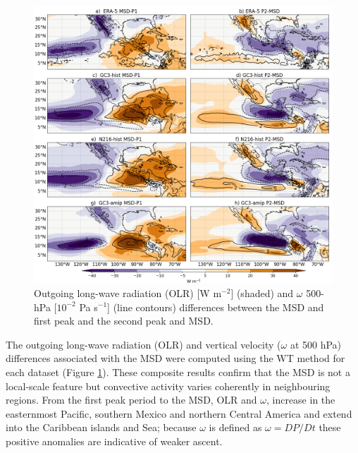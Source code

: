 
 \begin{figure}[t!]
\includegraphics[width=\linewidth]{figures/fig4_olrv_3.png}
\caption[OLR and vertical velocity composites]{Outgoing long-wave radiation (OLR) [W m$^{-2}$] (shaded) and $\omega$ 500-hPa [$10^{-2}$ Pa s$^{-1}$] (line contours) differences between the MSD and first peak and the second peak and MSD.}
\label{fig:olranom}
\end{figure}

 The outgoing long-wave radiation (OLR) and vertical velocity ($\omega$ at 500 hPa) differences associated with the MSD were computed using the WT method for each dataset (Figure \ref{fig:olranom}). These composite results confirm that the MSD is not a local-scale feature but convective activity varies coherently in neighbouring regions. From the first peak period to the MSD, OLR and $\omega$, increase in the easternmost Pacific, southern Mexico and northern Central America and extend into the Caribbean islands and Sea; because $\omega$ is defined as $\omega=DP/Dt$  these positive anomalies are indicative of weaker ascent. 
 
